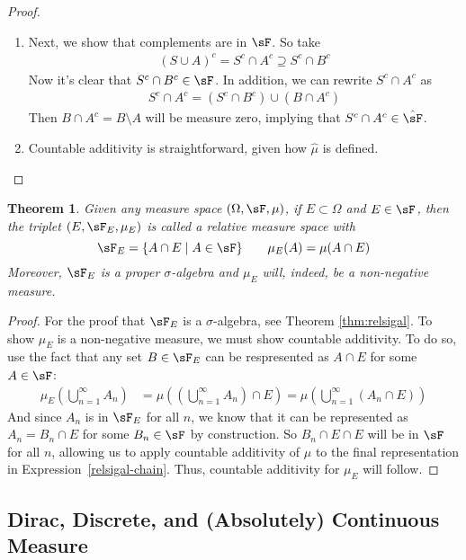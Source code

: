 \documentclass[12pt]{article}
\theoremstyle{plain}
\newtheorem{thm}{Theorem}[section]
\theoremstyle{definition}
\theoremstyle{remark}
\begin{document}
\begin{proof}
\begin{enumerate}
  \item
    Next, we show that complements are in $\sF$. So take
    \begin{align*}
      (S\cup A)^c = S^c \cap A^c \supseteq S^c \cap B^c
    \end{align*}
    Now it's clear that $S^c \cap B^c\in \sF$. In addition, we can
    rewrite $S^c\cap A^c$ as
    \begin{align*}
      S^c\cap A^c = (S^c \cap B^c) \cup (B\cap A^c)
    \end{align*}
    Then $B \cap A^c = B\setminus A$ will be measure zero, implying that
    $S^c \cap A^c\in \hat{\sF}$.

  \item Countable additivity is straightforward, given how $\hat{\mu}$
    is defined.
\end{enumerate}
\end{proof}

\begin{thm}
Given any measure space $(\Omega,\sF,\mu)$, if $E\subset \Omega$ and
$E\in\sF$, then the triplet $(E,\sF_E,\mu_E)$ is called
a \emph{relative measure space} with
\[
    \sF_E = \{ A \cap E \; | \; A \in \sF\}
    \qquad
    \mu_E(A) = \mu(A\cap E)
\]
Moreover, $\sF_E$ is a proper $\sigma$-algebra and $\mu_E$ will,
indeed, be a non-negative measure.
\end{thm}
\begin{proof}
For the proof that $\sF_E$ is a $\sigma$-algebra, see Theorem
\ref{thm:relsigal}. To show $\mu_E$ is a non-negative measure, we must
show countable additivity. To do so, use the fact that any set
$B\in\sF_E$ can be respresented as $A\cap E$ for some $A\in\sF$:
\begin{align}
    \label{relsigal-chain}
    \mu_E\left(\bigcup^\infty_{n=1} A_n \right)
    &= \mu\left(\left(\bigcup^\infty_{n=1} A_n
    \right) \cap E \right)
    = \mu\left(\bigcup^\infty_{n=1} (A_n
    \cap E)\right)
\end{align}
And since $A_n$ is in $\sF_E$ for all $n$, we know that it can be
represented as $A_n=B_n\cap E$ for some $B_n\in \sF$ by construction. So
$B_n \cap E \cap E$ will be in $\sF$ for all $n$, allowing us to apply
countable additivity of $\mu$ to the final representation in
Expression~\ref{relsigal-chain}. Thus, countable additivity for $\mu_E$
will follow.
\end{proof}

\clearpage
\subsection{Dirac, Discrete, and (Absolutely) Continuous Measure}
\end{document}
